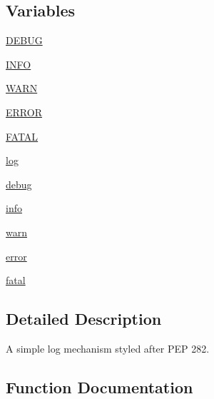 \subsection*{Variables}
\begin{DoxyCompactItemize}
\item 
\hyperlink{namespacesetuptools_1_1__distutils_1_1log_a7a195af7544f574ebe3940912e10f46a}{D\+E\+B\+UG}
\item 
\hyperlink{namespacesetuptools_1_1__distutils_1_1log_ac111405ed4fed3ec19148ac2f8bbed1f}{I\+N\+FO}
\item 
\hyperlink{namespacesetuptools_1_1__distutils_1_1log_a5fbf1710825f106a7c3ba1e983a66d9c}{W\+A\+RN}
\item 
\hyperlink{namespacesetuptools_1_1__distutils_1_1log_ab3c90dd7d2c6710c39cb76a79a44dd2b}{E\+R\+R\+OR}
\item 
\hyperlink{namespacesetuptools_1_1__distutils_1_1log_a6f9452c1c56b64d1b92d60b0ce4bf32c}{F\+A\+T\+AL}
\item 
\hyperlink{namespacesetuptools_1_1__distutils_1_1log_a5db8555ca41961be7616c64220044479}{log}
\item 
\hyperlink{namespacesetuptools_1_1__distutils_1_1log_a6ef08306a3ff44d92a12388ccb8a2d13}{debug}
\item 
\hyperlink{namespacesetuptools_1_1__distutils_1_1log_a684bf8acbf4bf28ff5105f78d1309f6d}{info}
\item 
\hyperlink{namespacesetuptools_1_1__distutils_1_1log_ae6ca2e29132cd021a983dfe74364fcac}{warn}
\item 
\hyperlink{namespacesetuptools_1_1__distutils_1_1log_a42ba40cd4f2dd7340929cc9efdf50ed3}{error}
\item 
\hyperlink{namespacesetuptools_1_1__distutils_1_1log_af83f6b7b66e81ce7b7ba972d66a4f238}{fatal}
\end{DoxyCompactItemize}


\subsection{Detailed Description}
\begin{DoxyVerb}A simple log mechanism styled after PEP 282.\end{DoxyVerb}
 

\subsection{Function Documentation}
\mbox{\label{namespacesetuptools_1_1__distutils_1_1log_a4e8da2b4bd1db5040a7f283fa429f6a7}} 
